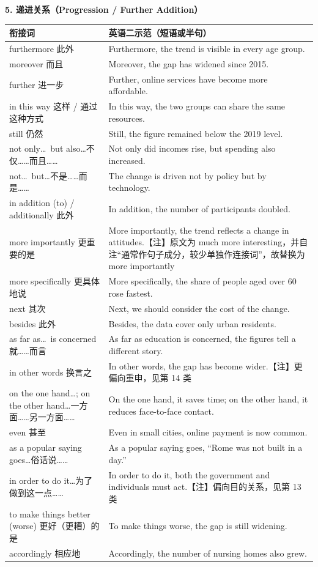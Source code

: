 \documentclass[11pt,a4paper]{ctexart}
\begin{document}
\par\addvspace{6pt}\noindent\textbf{5. 递进关系（Progression / Further Addition）}\par\addvspace{2pt}
\begin{longtable}{L{5.4cm}L{10.6cm}}
\toprule
\textbf{衔接词} & \textbf{英语二示范（短语或半句）} \\
\midrule
\endhead
furthermore 此外 & Furthermore, the trend is visible in every age group. \\
moreover 而且 & Moreover, the gap has widened since 2015. \\
further 进一步 & Further, online services have become more affordable. \\
in this way 这样 / 通过这种方式 & In this way, the two groups can share the same resources. \\
still 仍然 & Still, the figure remained below the 2019 level. \\
not only\ldots\ but also\ldots 不仅……而且…… & Not only did incomes rise, but spending also increased. \\
not\ldots\ but\ldots 不是……而是…… & The change is driven not by policy but by technology. \\
in addition (to) / additionally 此外 & In addition, the number of participants doubled. \\
more importantly 更重要的是 & More importantly, the trend reflects a change in attitudes.【注】原文为 much more interesting，并自注“通常作句子成分，较少单独作连接词”，故替换为 more importantly \\
more specifically 更具体地说 & More specifically, the share of people aged over 60 rose fastest. \\
next 其次 & Next, we should consider the cost of the change. \\
besides 此外 & Besides, the data cover only urban residents. \\
as far as\ldots\ is concerned 就……而言 & As far as education is concerned, the figures tell a different story. \\
in other words 换言之 & In other words, the gap has become wider.【注】更偏向重申，见第 14 类 \\
on the one hand\ldots; on the other hand\ldots 一方面……另一方面…… & On the one hand, it saves time; on the other hand, it reduces face-to-face contact. \\
even 甚至 & Even in small cities, online payment is now common. \\
as a popular saying goes\ldots 俗话说…… & As a popular saying goes, “Rome was not built in a day.” \\
in order to do it\ldots 为了做到这一点…… & In order to do it, both the government and individuals must act.【注】偏向目的关系，见第 13 类 \\
to make things better (worse) 更好（更糟）的是 & To make things worse, the gap is still widening. \\
accordingly 相应地 & Accordingly, the number of nursing homes also grew. \\
\bottomrule
\end{longtable}
\end{document}
